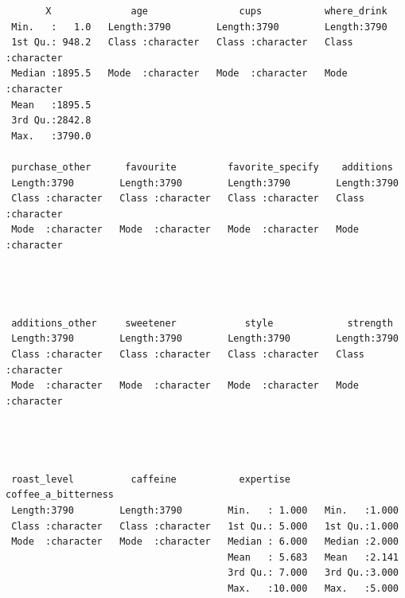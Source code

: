 \documentclass[
  letterpaper,
  DIV=11,
  numbers=noendperiod]{scrartcl}
\begin{document}
\begin{verbatim}
       X              age                cups           where_drink       
 Min.   :   1.0   Length:3790        Length:3790        Length:3790       
 1st Qu.: 948.2   Class :character   Class :character   Class :character  
 Median :1895.5   Mode  :character   Mode  :character   Mode  :character  
 Mean   :1895.5                                                           
 3rd Qu.:2842.8                                                           
 Max.   :3790.0                                                           
                                                                          
 purchase_other      favourite         favorite_specify    additions        
 Length:3790        Length:3790        Length:3790        Length:3790       
 Class :character   Class :character   Class :character   Class :character  
 Mode  :character   Mode  :character   Mode  :character   Mode  :character  
                                                                            
                                                                            
                                                                            
                                                                            
 additions_other     sweetener            style             strength        
 Length:3790        Length:3790        Length:3790        Length:3790       
 Class :character   Class :character   Class :character   Class :character  
 Mode  :character   Mode  :character   Mode  :character   Mode  :character  
                                                                            
                                                                            
                                                                            
                                                                            
 roast_level          caffeine           expertise      coffee_a_bitterness
 Length:3790        Length:3790        Min.   : 1.000   Min.   :1.000      
 Class :character   Class :character   1st Qu.: 5.000   1st Qu.:1.000      
 Mode  :character   Mode  :character   Median : 6.000   Median :2.000      
                                       Mean   : 5.683   Mean   :2.141      
                                       3rd Qu.: 7.000   3rd Qu.:3.000      
                                       Max.   :10.000   Max.   :5.000      
                                                                           

\end{verbatim}
\end{document}
